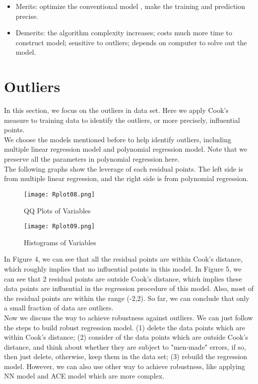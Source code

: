 \documentclass[12pt,a4paper]{article}
\begin{document}
\begin{itemize}
	\item Merits: optimize the conventional model , make the training and prediction precise.
	\item Demerits: the algorithm complexity increases; costs much more time to construct model; sensitive to outliers; depends on computer to solve out the model.
\end{itemize}


\section{Outliers}
\qquad In this section, we focus on the outliers in data set. Here we apply Cook's measure to training data to identify the outliers, or more precisely, influential points.\\
\indent We choose the models mentioned before to help identify outliers, including multiple linear regression model and polynomial regression model. Note that we preserve all the parameters in polynomial regression here.\\
\indent The following graphs show the leverage of each residual points. The left side is from multiple linear regression, and the right side is from polynomial regression.

\begin{figure}[h]
	\centering
	\begin{minipage}[h]{0.48\textwidth}
		\centering
		\texttt{[image: Rplot08.png]}
		\caption{QQ Plots of Variables}
	\end{minipage}
	\begin{minipage}[h]{0.48\textwidth}
		\centering
		\texttt{[image: Rplot09.png]}
		\caption{Histograms of Variables}
	\end{minipage}                      
\end{figure}

In Figure 4, we can see that all the residual points are within Cook's distance, which roughly implies that no influential points in this model. In Figure 5, we can see that 2 residual points are outside Cook's distance, which implies these data points are influential in the regression procedure of this model. Also, most of the residual points are within the range (-2,2). So far, we can conclude that only a small fraction of data are outliers.\\
\indent Now we discuss the way to achieve robustness against outliers. We can just follow the steps to build robust regression model. (1) delete the data points which are within Cook's distance; (2) consider of the data points which are outside Cook's distance, and think about whether they are subject to "men-made" errors, if so, then just delete, otherwise, keep them in the data set; (3) rebuild the regression model. However, we can also use other way to achieve robustness, like applying NN model and ACE model which are more complex.
\end{document}
